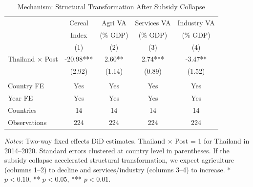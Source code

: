 \begin{table}[htbp]
\centering
\begin{threeparttable}
\caption{Mechanism: Structural Transformation After Subsidy Collapse}
\label{tab:mechanism}
\begin{tabular}{lcccc}
\toprule
 & Cereal & Agri VA & Services VA & Industry VA \\
 & Index & (\% GDP) & (\% GDP) & (\% GDP) \\
 & (1) & (2) & (3) & (4) \\
\midrule
  Thailand $\times$ Post & -20.98*** & 2.60** & 2.74*** & -3.47** \\
  & (2.92) & (1.14) & (0.89) & (1.52) \\
 & & & & \\
  Country FE & Yes & Yes & Yes & Yes \\
  Year FE & Yes & Yes & Yes & Yes \\
  Countries & 14 & 14 & 14 & 14 \\
  Observations & 224 & 224 & 224 & 224 \\
\bottomrule
\end{tabular}
\begin{tablenotes}[flushleft]\footnotesize
\item \textit{Notes:} Two-way fixed effects DiD estimates. Thailand $\times$ Post = 1 for Thailand in 2014--2020. Standard errors clustered at country level in parentheses. If the subsidy collapse accelerated structural transformation, we expect agriculture (columns 1--2) to decline and services/industry (columns 3--4) to increase. * $p<0.10$, ** $p<0.05$, *** $p<0.01$.
\end{tablenotes}
\end{threeparttable}
\end{table}
